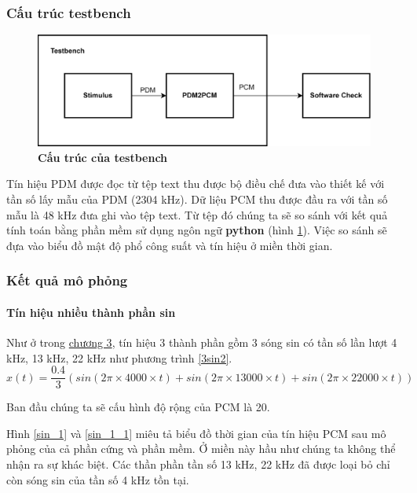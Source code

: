 \subsubsection{Cấu trúc testbench}
\begin{figure}[H]
    \centering
    \includegraphics[width=13cm]{Images/Chuong4/tb/tb_top.png}
    \caption[Cấu trúc của testbench]{\bfseries \fontsize{12pt}{0pt}\selectfont  Cấu trúc của testbench}
    \label{tb_top}
\end{figure}

Tín hiệu PDM được đọc từ tệp text thu được bộ điều chế đưa vào thiết kế với tần số lấy mẫu của PDM (2304 kHz). Dữ liệu PCM thu được đầu ra với tần số mẫu là 48 kHz đưa ghi vào tệp text. Từ tệp đó chúng ta sẽ so sánh với kết quả tính toán bằng phần mềm sử dụng ngôn ngữ \textbf{python} (hình \ref{tb_top}). Việc so sánh sẽ đựa vào biểu đồ mật độ phổ công suất và tín hiệu ở miền thời gian.

\subsubsection{Kết quả mô phỏng}
\paragraph{Tín hiệu nhiều thành phần sin}
Như ở trong \hyperref[chuong3]{chương 3}, tín hiệu 3 thành phần gồm 3 sóng sin có tần số lần lượt 4 kHz, 13 kHz, 22 kHz như phương trình \ref{3sin2}.
\begin{equation} \label{3sin2}
    x(t) = \frac{0.4}{3} (sin(2\pi \times 4000\times t) + sin(2\pi \times 13000\times t) + sin(2\pi \times 22000\times t))
\end{equation}

Ban đầu chúng ta sẽ cấu hình độ rộng của PCM là 20.

Hình \ref{sin_1} và \ref{sin_1_1} miêu tả biểu đồ thời gian của tín hiệu PCM sau mô phỏng của cả phần cứng và phần mềm. Ở miền này hầu như chúng ta không thể nhận ra sự khác biệt. Các thần phần tần số 13 kHz, 22 kHz đã được loại bỏ chỉ còn sóng sin của tần số 4 kHz tồn tại.

